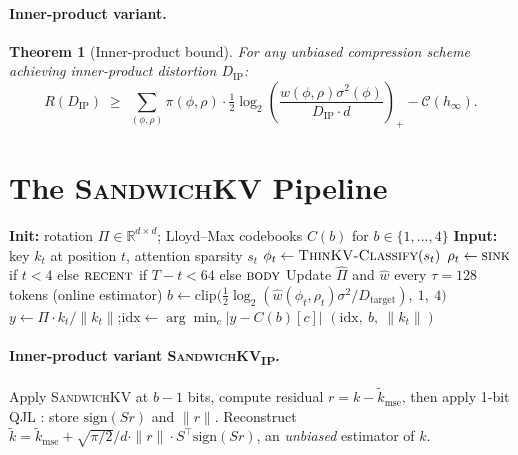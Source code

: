 \documentclass[11pt]{article}
\newtheorem{theorem}{Theorem}
\theoremstyle{definition}
\newcommand{\R}{\mathbb{R}}
\newcommand{\hinf}{h_\infty}
\newcommand{\sink}{\textsc{sink}}
\newcommand{\body}{\textsc{body}}
\newcommand{\recent}{\textsc{recent}}
\newcommand{\eq}{\textsc{SandwichKV}}
\newcommand{\eqp}{\textsc{SandwichKV}\textsubscript{IP}}
\begin{document}
\paragraph{Inner-product variant.}
\begin{theorem}[Inner-product bound]
\label{thm:ip-bound}
For any unbiased compression scheme achieving inner-product distortion $D_\text{IP}$:
\begin{equation}
R(D_\text{IP}) \;\ge\; \sum_{(\phi, \rho)} \pi(\phi, \rho) \cdot \tfrac{1}{2}\log_2\!\left(\frac{w(\phi,\rho)\sigma^2(\phi)}{D_\text{IP} \cdot d}\right)_+ - \mathcal{C}(\hinf).
\end{equation}
\end{theorem}

\section{The \eq{} Pipeline}
\label{sec:pipeline}

\begin{algorithm}[h]
\caption{\eq{} (one layer, one token, online)}
\label{alg:entroquant}
\begin{algorithmic}[1]
\State \textbf{Init:} rotation $\Pi \in \R^{d\times d}$; Lloyd--Max codebooks $C(b)$ for $b \in \{1,\ldots,4\}$
\State \textbf{Input:} key $k_t$ at position $t$, attention sparsity $s_t$
\State $\phi_t \gets \textsc{ThinKV-Classify}(s_t)$ 
\State $\rho_t \gets \sink$ if $t<4$ else $\recent$ if $T-t<64$ else $\body$ 
\State Update $\hat\Pi$ and $\hat w$ every $\tau{=}128$ tokens (online estimator)
\State $b \gets \mathrm{clip}\bigl(\tfrac{1}{2}\log_2(\hat w(\phi_t, \rho_t)\sigma^2/D_\text{target}),\ 1,\ 4\bigr)$ 
\State $y \gets \Pi \cdot k_t / \|k_t\|$;\quad $\mathrm{idx} \gets \arg\min_c |y - C(b)[c]|$ 
\State \Return $(\mathrm{idx},\ b,\ \|k_t\|)$
\end{algorithmic}
\end{algorithm}

\paragraph{Inner-product variant \eqp.}
Apply \eq{} at $b{-}1$ bits, compute residual $r = k - \tilde k_\text{mse}$, then apply 1-bit QJL \citep{qjl}: store $\text{sign}(Sr)$ and $\|r\|$. Reconstruct $\tilde k = \tilde k_\text{mse} + \sqrt{\pi/2}/d \cdot \|r\| \cdot S^\top \text{sign}(Sr)$, an \emph{unbiased} estimator of $k$.
\end{document}
